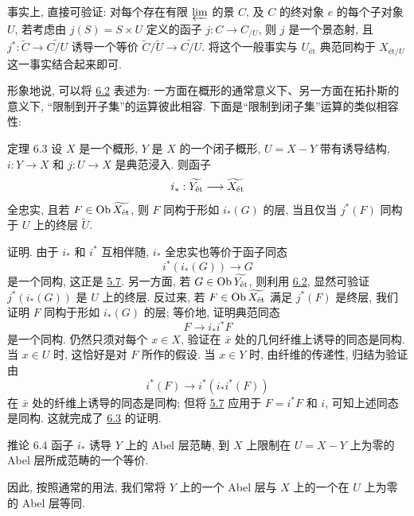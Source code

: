 事实上, 直接可验证:
对每个存在有限 $\varprojlim$ 的景 $C$,
及 $C$ 的终对象 $e$ 的每个子对象 $U$,
若考虑由 $j(S) = S \times U$ 定义的函子 $j : C \to C_{/U}$,
则 $j$ 是一个景态射,
且 $j^{\ast} : \widetilde{C} \to \widetilde{C/U}$
诱导一个等价 $\widetilde{C}/\widetilde{U} \to \widetilde{C / U}$.
将这个一般事实与 $U_{\text{ét}}$ 典范同构于 $X_{\text{ét}/U}$ 这一事实结合起来即可.

形象地说, 可以将 \hyperref[VIII.cor6.2]{6.2} 表述为:
一方面在概形的通常意义下、另一方面在拓扑斯的意义下,
“限制到开子集”的运算彼此相容.
下面是“限制到闭子集”运算的类似相容性:

\begin{enonce*}{定理 6.3}
设 $X$ 是一个概形, $Y$ 是 $X$ 的一个闭子概形,
$U = X - Y$ 带有诱导结构,
$i : Y \to X$ 和 $j : U \to X$ 是典范浸入.
则函子
$$
i_{\ast} : \widetilde{Y_{\text{\rm ét}}} \to \widetilde{X_{\text{\rm ét}}}
$$
全忠实, 且若 $F \in \operatorname{Ob} \widetilde{X_{\text{\rm ét}}}$,
则 $F$ 同构于形如 $i_{\ast} (G)$ 的层,
当且仅当 $j^{\ast}(F)$ 同构于 $U$ 上的终层 $\widetilde{U}$.
\end{enonce*}

证明. 由于 $i_{\ast}$ 和 $i^{\ast}$ 互相伴随,
$i_{\ast}$ 全忠实也等价于函子同态
$$
i^{\ast} (i_{\ast}(G)) \to G
$$
是一个\pageoriginale 同构, 这正是 \hyperref[VIII.cor5.7]{5.7}.
另一方面, 若 $G \in \operatorname{Ob} \widetilde{Y_{\text{ét}}}$,
则利用 \hyperref[VIII.cor6.2]{6.2}, 显然可验证
$j^{\ast} (i_{\ast}(G))$ 是 $U$ 上的终层.
反过来, 若 $F \in \operatorname{Ob} \widetilde{X_{\text{ét}}}$
满足 $j^{\ast}(F)$ 是终层,
我们证明 $F$ 同构于形如 $i_{\ast}(G)$ 的层;
等价地, 证明典范同态
$$
F \to i_{\ast} i^{\ast} F
$$
是一个同构.
仍然只须对每个 $x \in X$,
验证在 $\bar{x}$ 处的几何纤维上诱导的同态是同构.
当 $x \in U$ 时, 这恰好是对 $F$ 所作的假设.
当 $x \in Y$ 时, 由纤维的传递性,
归结为验证由
$$
i^{\ast} (F) \to i^{\ast} (i_{\ast} i^{\ast} (F))
$$
在 $\bar{x}$ 处的纤维上诱导的同态是同构;
但将 \hyperref[VIII.cor5.7]{5.7} 应用于 $F = i^{\ast} F$ 和 $i$,
可知上述同态是同构.
这就完成了 \hyperref[VIII.thm6.3]{6.3} 的证明.

\begin{enonce*}{推论 6.4}
函子 $i_{\ast}$ 诱导 $Y$ 上的 Abel 层范畴,
到 $X$ 上限制在 $U = X - Y$ 上为零的 Abel 层所成范畴的一个等价.
\end{enonce*}

因此, 按照通常的用法,
我们常将 $Y$ 上的一个 Abel 层与 $X$ 上的一个在 $U$ 上为零的 Abel 层等同.

\setcounter{subsection}{4}
\subsection{}

